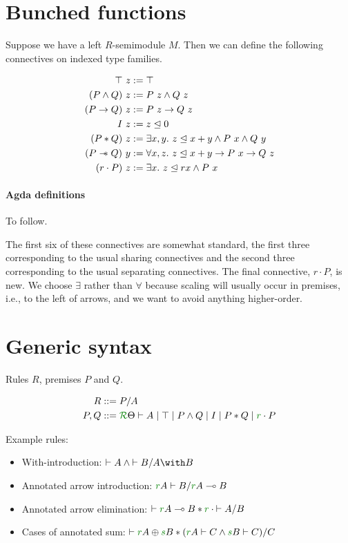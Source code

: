 \documentclass[a4paper]{article}
\begin{document}
\section{Bunched functions}

Suppose we have a left $R$-semimodule $M$.
Then we can define the following connectives on indexed type families.

\begin{align*}
  \top~z &:= \top \\
  (P \wedge Q)~z &:= P~z \wedge Q~z \\
  (P \to Q)~z &:= P~z \to Q~z \\
  I~z &:= z \trianglelefteq 0 \\
  (P * Q)~z &:= \exists x,y.~z \trianglelefteq x+y \wedge P~x \wedge Q~y \\
  (P \mathrel{\mathord{-}\hspace{-0.75ex}*} Q)~y &:= \forall x,z.~z \trianglelefteq x+y \to P~x \to Q~z \\
  (r \cdot P)~z &:= \exists x.~z \trianglelefteq rx \wedge P~x
\end{align*}

\paragraph{Agda definitions}
To follow.

The first six of these connectives are somewhat standard, the first three
corresponding to the usual sharing connectives and the second three
corresponding to the usual separating connectives.
The final connective, $r \cdot P$, is new.
We choose $\exists$ rather than $\forall$ because scaling will usually occur in
premises, i.e., to the left of arrows, and we want to avoid anything
higher-order.

\section{Generic syntax}

Rules $R$, premises $P$ and $Q$.

\begin{align*}
  R &::= P/A \\
  P,Q &::= \ctx \Theta R \vdash A \mid \top \mid P \wedge Q \mid I \mid P * Q
        \mid \rescomment r \cdot P
\end{align*}

Example rules:

\begin{itemize}
  \item With-introduction: ${\vdash A} \wedge {\vdash B} / \withT{A}{B}$
  \item Annotated arrow introduction:
    ${\rescomment rA \vdash B} / \fun{\rescomment rA}{B}$
  \item Annotated arrow elimination:
    ${\vdash \fun{\rescomment rA}{B}} * \rescomment r \cdot {\vdash A} / B$
  \item Cases of annotated sum:
    ${\vdash \sumT{\rescomment rA}{\rescomment sB}}
    * ({\rescomment rA \vdash C} \wedge {\rescomment sB \vdash C}) / C$
\end{itemize}
\end{document}
